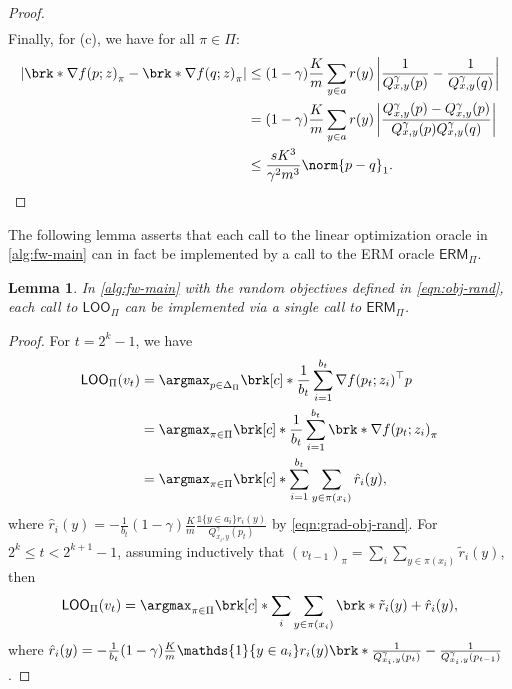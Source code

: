 \documentclass[11pt]{article}
\renewcommand{\ind}[1]{\mathds{1}\{#1\}}
\newcommand{\yprobg}[3]{Q^\gamma_{#2,#3}(#1)}
\newcommand{\loo}{\textsf{LOO}}
\newcommand{\oracle}{\textsf{ERM}}
\newcommand{\pred}{a}
\newcommand{\rew}{r}
\newcommand{\lab}{y}
\newcommand{\objrand}{f}
\theoremstyle{plain}
\newtheorem{lemma}{Lemma}
\begin{document}
\begin{proof}
\begin{align*}
    \end{align*}
    Finally, for (c), we have for all $\pi \in \Pi$:
    \begin{align*}
        \left| \brk*{\nabla \objrand(p;z)}_\pi - \brk*{\nabla \objrand(q;z)}_\pi \right| 
        &\leq
        (1-\gamma) \frac{K}{m} \sum_{\lab \in \pred} \rew(\lab) \left| \frac{1}{\yprobg{p}{x}{\lab}} - \frac{1}{\yprobg{q}{x}{\lab}} \right| \\
        &=
        (1-\gamma) \frac{K}{m} \sum_{\lab \in \pred} \rew(\lab) \left| \frac{\yprobg{p}{x}{\lab} - \yprobg{p}{x}{\lab}}{\yprobg{p}{x}{\lab}\yprobg{q}{x}{\lab}} \right| \\
        &\leq
        \frac{sK^3}{\gamma^2 m^3} \norm{p-q}_1.
    \end{align*}
\end{proof}

The following lemma asserts that each call to the linear optimization oracle in \cref{alg:fw-main} can in fact be implemented by a call to the ERM oracle $\oracle_\Pi$.

\begin{lemma}
\label{lem:fw-loo-erm}
    In \cref{alg:fw-main} with the random objectives defined in \cref{eqn:obj-rand}, each call to $\loo_\Pi$ can be implemented via a single call to $\oracle_\Pi$.
\end{lemma}

\begin{proof}
    For $t = 2^k - 1$, we have
    \begin{align*}
        \loo_\Pi(v_t) &= \argmax_{p \in \Delta_\Pi} \brk[c]*{\frac{1}{b_t} \sum_{i=1}^{b_t} \nabla \objrand(p_t;z_i)^\top p} \\
        &=
        \argmax_{\pi \in \Pi} \brk[c]*{\frac{1}{b_t} \sum_{i=1}^{b_t} \brk*{\nabla \objrand(p_t;z_i)}_\pi} \\
        &=
        \argmax_{\pi \in \Pi} \brk[c]*{\sum_{i=1}^{b_t} \sum_{\lab \in \pi(x_i)} \hat \rew_i(\lab)},
    \end{align*}
    where $\hat \rew_i(\lab) = - \frac{1}{b_t} (1-\gamma) \frac{K}{m}\frac{\ind{\lab \in \pred_i} \rew_i(\lab)}{\yprobg{p_t}{x_i}{\lab}}$ by \cref{eqn:grad-obj-rand}. For $2^k \leq t < 2^{k+1} - 1$, assuming inductively that $(v_{t-1})_\pi = \sum_{i} \sum_{\lab \in \pi(x_i)} \tilde \rew_i(\lab)$, then
    \begin{align*}
        \loo_\Pi(v_t) 
        = 
        \argmax_{\pi \in \Pi} \brk[c]*{\sum_i \sum_{\lab \in \pi(x_i)} \brk*{\tilde \rew_i(\lab) + \hat \rew_i(\lab)}},
    \end{align*}
    where $\hat \rew_i(\lab) = - \frac{1}{b_t} (1-\gamma) \frac{K}{m}\ind{\lab \in \pred_i} \rew_i(\lab) \brk*{\frac{1}{\yprobg{p_t}{x_i}{\lab}} - \frac{1}{\yprobg{p_{t-1}}{x_i}{\lab}}}$.
\end{proof}
\end{document}
